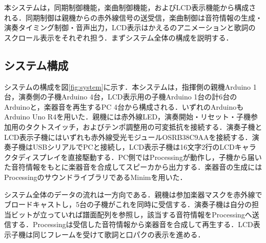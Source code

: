 \documentclass[uplatex,dvipdfmx]{jlreq}
\begin{document}
本システムは，同期制御機能，楽曲制御機能，およびLCD表示機能から構成される．同期制御は親機からの赤外線信号の送受信，楽曲制御は音符情報の生成・演奏タイミング制御・音声出力，LCD表示はかえるのアニメーションと歌詞のスクロール表示をそれぞれ担う．まずシステム全体の構成を説明する．

\subsection{システム構成}

システムの構成を図\ref{fig:system}に示す．本システムは，指揮側の親機Arduino 1台，演奏側の子機Arduino 4台，LCD表示用の子機Arduino 1台の計6台のArduinoと，楽器音を再生するPC 4台から構成される．いずれのArduinoもArduino Uno R4を用いた．親機には赤外線LED，演奏開始・リセット・子機参加用のタクトスイッチ，およびテンポ調整用の可変抵抗を接続する．演奏子機とLCD表示子機にはいずれも赤外線受光モジュールOSRB38C9AA\cite{osrb}を接続する．演奏子機はUSBシリアルでPCと接続し，LCD表示子機は16文字2行のLCDキャラクタディスプレイを直接駆動する．PC側ではProcessingが動作し，子機から届いた音符情報をもとに楽器音を合成してスピーカから出力する．楽器音の生成にはProcessingのサウンドライブラリであるMinim\cite{minim}を用いた．


システム全体のデータの流れは一方向である．親機は参加楽器マスクを赤外線でブロードキャストし，5台の子機がこれを同時に受信する．演奏子機は自分の担当ビットが立っていれば譜面配列を参照し，該当する音符情報をProcessingへ送信する．Processingは受信した音符情報から楽器音を合成して再生する．LCD表示子機は同じフレームを受けて歌詞と口パクの表示を進める．
\end{document}
